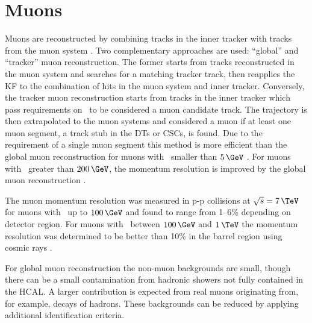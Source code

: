 \section{Muons}
\label{sec:objects_muo}
Muons are reconstructed by combining tracks in the inner tracker with tracks
from the muon system \cite{cms-muon-reco}. Two complementary approaches are used:
``global'' and ``tracker'' muon reconstruction. The former starts from 
tracks reconstructed in the muon system and searches for a matching
tracker track, then reapplies the \ac{KF} to the combination
of hits in the muon system and inner tracker. Conversely, the tracker muon reconstruction starts from
tracks in the inner tracker which pass requirements on \pT~to be considered
a muon candidate track. The trajectory is then extrapolated to the muon systems and
considered a muon if at least one muon segment, a track stub in the \acp{DT} or \acp{CSC}, is found.
Due to the requirement of a single muon segment this method is more efficient than the global muon
reconstruction for muons with \pT~smaller than $5\,\GeV$ \cite{cms-muon-reco}.
For muons with \pT~greater than $200\,\GeV$, the momentum resolution is improved
by the global muon reconstruction \cite{cms-muon-cosmics-perf}.

The muon momentum resolution was measured in p-p collisions at $\sqrt{s}=7\,\TeV$ 
for muons with \pT~up to $100\,\GeV$ and found to range from 1--6\% depending
on detector region. For muons with \pT~between $100\,\GeV$ and $1\,\TeV$ the momentum resolution
was determined to be better than 10\% in the barrel region using cosmic rays \cite{cms-muon-reco}.

For global muon reconstruction the non-muon backgrounds are small,
though there can be a small contamination from hadronic showers not fully
contained in the \ac{HCAL}. A larger contribution is expected
from real muons originating from, for example, decays of hadrons. These
backgrounds can be reduced by applying additional identification criteria.

